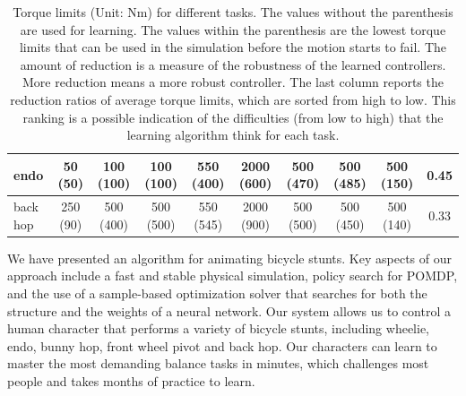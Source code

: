 \begin{table}
\begin{tabular}{|l|c|c|c|c|c|c|c|c|c|}
\hline
endo & 50 (50) & 100 (100) & 100 (100) & 550 (400) & 2000 (600) & 500 (470) & 500 (485) & 500 (150) & 0.45\\
\hline
back hop & 250 (90) & 500 (400) & 500 (500) & 550 (545) & 2000 (900) & 500 (500) & 500 (450) & 500 (140) & 0.33\\
\hline
 \end{tabular}
 \caption{Torque limits (Unit: Nm) for different tasks. The values without the parenthesis are used for learning. The values within the parenthesis are the lowest torque limits that can be used in the simulation before the motion starts to fail. The amount of reduction is a measure of the robustness of the learned controllers. More reduction means a more robust controller. The last column reports the reduction ratios of average torque limits, which are sorted from high to low. This ranking is a possible indication of the difficulties (from low to high) that the learning algorithm think for each task. }
 \label{table:torqueLimit}
\end{table}


We have presented an algorithm for animating bicycle stunts.  Key aspects of our approach include a fast and stable physical simulation,
policy search for POMDP, and
the use of a sample-based optimization solver that searches for both the structure and the weights of a neural network.
Our system allows us to control a human character that
performs a variety of bicycle stunts, including wheelie, endo, bunny hop, front wheel pivot and back hop.
Our characters can learn to master the most demanding balance tasks in minutes, which challenges most people and takes months of practice to learn.

